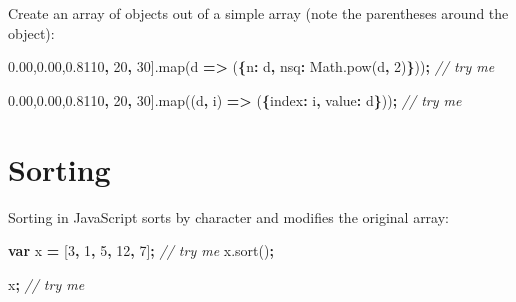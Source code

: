 \documentclass[openany]{book}
\newenvironment{Shaded}{\begin{snugshade}}{\end{snugshade}}
\newcommand{\AttributeTok}[1]{\textcolor[rgb]{0.77,0.63,0.00}{#1}}
\newcommand{\CommentTok}[1]{\textcolor[rgb]{0.56,0.35,0.01}{\textit{#1}}}
\newcommand{\DataTypeTok}[1]{\textcolor[rgb]{0.13,0.29,0.53}{#1}}
\newcommand{\DecValTok}[1]{\textcolor[rgb]{0.00,0.00,0.81}{#1}}
\newcommand{\KeywordTok}[1]{\textcolor[rgb]{0.13,0.29,0.53}{\textbf{#1}}}
\newcommand{\NormalTok}[1]{#1}
\newcommand{\OperatorTok}[1]{\textcolor[rgb]{0.81,0.36,0.00}{\textbf{#1}}}
\newcommand{\VariableTok}[1]{\textcolor[rgb]{0.00,0.00,0.00}{#1}}
\begin{document}
Create an array of objects out of a simple array (note the parentheses around the object):

\begin{Shaded}
\begin{Highlighting}[]
\NormalTok{[}\DecValTok{10}\OperatorTok{,} \DecValTok{20}\OperatorTok{,} \DecValTok{30}\NormalTok{].}\AttributeTok{map}\NormalTok{(d }\OperatorTok{=>}\NormalTok{ (}\OperatorTok{\{}\DataTypeTok{n}\OperatorTok{:}\NormalTok{ d}\OperatorTok{,} \DataTypeTok{nsq}\OperatorTok{:} \VariableTok{Math}\NormalTok{.}\AttributeTok{pow}\NormalTok{(d}\OperatorTok{,} \DecValTok{2}\NormalTok{)}\OperatorTok{\}}\NormalTok{))}\OperatorTok{;}  \CommentTok{// try me}
\end{Highlighting}
\end{Shaded}

\begin{Shaded}
\begin{Highlighting}[]
\NormalTok{[}\DecValTok{10}\OperatorTok{,} \DecValTok{20}\OperatorTok{,} \DecValTok{30}\NormalTok{].}\AttributeTok{map}\NormalTok{((d}\OperatorTok{,}\NormalTok{ i) }\OperatorTok{=>}\NormalTok{ (}\OperatorTok{\{}\DataTypeTok{index}\OperatorTok{:}\NormalTok{ i}\OperatorTok{,} \DataTypeTok{value}\OperatorTok{:}\NormalTok{ d}\OperatorTok{\}}\NormalTok{))}\OperatorTok{;}  \CommentTok{// try me}
\end{Highlighting}
\end{Shaded}

\hypertarget{sorting}{%
\section{Sorting}\label{sorting}}

Sorting in JavaScript sorts by character and modifies the original array:

\begin{Shaded}
\begin{Highlighting}[]
\KeywordTok{var}\NormalTok{ x }\OperatorTok{=}\NormalTok{ [}\DecValTok{3}\OperatorTok{,} \DecValTok{1}\OperatorTok{,} \DecValTok{5}\OperatorTok{,} \DecValTok{12}\OperatorTok{,} \DecValTok{7}\NormalTok{]}\OperatorTok{;}     \CommentTok{// try me}
\VariableTok{x}\NormalTok{.}\AttributeTok{sort}\NormalTok{()}\OperatorTok{;}
\end{Highlighting}
\end{Shaded}

\begin{Shaded}
\begin{Highlighting}[]
\NormalTok{x}\OperatorTok{;}     \CommentTok{// try me}
\end{Highlighting}
\end{Shaded}
\end{document}
